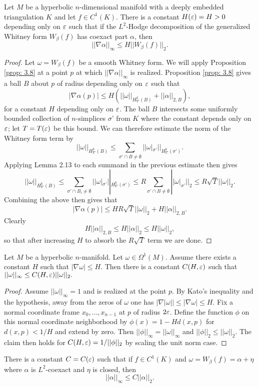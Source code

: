 \begin{prop}\label{prop: 3.9} 
Let $M$ be a hyperbolic $n$-dimensional manifold with a deeply embedded triangulation $K$ and let $f\in C^1(K)$. There is a constant $H(\varepsilon) = H >0$ depending only on $\varepsilon$ such that if the $L^2$-Hodge decomposition of the generalized Whitney form $W_{\beta}(f)$ has coexact part $\alpha$,  then  $$
||\nabla \alpha||_{\infty}\leq H||W_{\beta}(f)||_2.$$
\end{prop}
\begin{proof}
Let $\omega = W_{\beta}(f)$ be a smooth Whitney form. We will apply Proposition \ref{prop: 3.8} at a point $p$ at which $||\nabla\alpha||_{\infty}$ is realized. Proposition \ref{prop: 3.8} gives a ball $B$ about $p$ of radius depending only on $\varepsilon$ such that $$|
\nabla \alpha(p)|\leq H\left(||\omega||_{H^k_{\nabla}(B)} + ||\alpha||_{2,B}\right),$$ for a constant $H$ depending only on $\varepsilon$.
The ball $B$ intersects some uniformly bounded collection of $n$-simplices $\sigma’$ from $K$ where the constant depends only on $\varepsilon$; let $T = T(\varepsilon)$ be this bound. We can therefore estimate the norm of the Whitney form term by $$||\omega||_{H^k_{\nabla}(B)}\leq \sum\limits_{\sigma’\cap B \neq \emptyset} ||\omega|_{\sigma’}||_{H^k_{\nabla}(\sigma’)}.$$
Applying Lemma 2.13 to each summand in the previous estimate then gives
$$ ||\omega||_{H^k_{\nabla}(B)} \leq \sum\limits_{\sigma’\cap B_i \neq \emptyset} ||\omega|_{\sigma’}||_{H^k_{\nabla}(\sigma’)}\leq R\sum\limits_{\sigma’\cap B \neq \emptyset} ||\omega|_{\sigma’}||_2\leq R\sqrt{T}||\omega||_2.$$
Combining the above then gives that $$|\nabla \alpha(p)|\leq HR\sqrt{T}||\omega||_2 + H||\alpha||_{2,B}.$$ Clearly $$H||\alpha||_{2,B}\leq H||\alpha||_2 \leq H||\omega||_2,$$ so that after increasing $H$ to absorb the $R\sqrt{T}$ term we are done.
\end{proof}

\begin{prop}\label{prop: 3.10} 
Let $M$ be a hyperbolic $n$-manifold. Let $\omega\in \Omega^1(M).$ Assume there exists a constant $H$ such that $|\nabla \omega| \leq H$. Then there is a constant $C(H,\varepsilon)$ such that $||\omega||_{\infty}\leq C(H,\varepsilon) ||\omega||_2.$
\end{prop}

\begin{proof} Assume $||\omega||_{\infty} = 1$ and is realized at the point $p$. By Kato’s inequality and the hypothesis, away from the zeros of $\omega$ one has $|\nabla|\omega||\leq |\nabla \omega| \leq H$. Fix a normal coordinate frame $x_0,\dots,x_{n-1}$ at $p$ of radius $2\varepsilon$. Define the function $\phi$ on this normal coordinate neighborhood by $\phi(x) = 1- Hd(x,p)$ for $ d(x,p) < 1/H$ and extend by zero.
Then $||\phi||_{\infty} = ||\omega||_{\infty}$ and $||\phi||_2 \leq ||\omega||_2$.
The claim then holds for $C(H,\varepsilon) = 1/||\phi||_2$ by scaling the unit norm case.
\end{proof}
\begin{prop}\label{prop: 3.11} 
There is a constant $C = C(\varepsilon)$ such that if $f \in C^1(K)$ and $\omega = W_{\beta}(f)  = \alpha + \eta$ where $\alpha$ is $L^2$-coexact and $\eta$ is closed, then $$||\alpha||_{\infty} \leq C ||\alpha||_2.$$
\end{prop}

